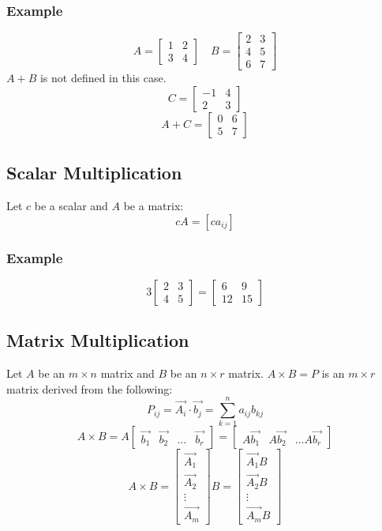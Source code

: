 \documentclass[letterpaper, 12pt]{math}
\begin{document}
\subsubsection*{Example}
\[ A = \begin{bmatrix}1 & 2 \\ 3 & 4\end{bmatrix} \quad
  B = \begin{bmatrix}2 & 3 \\ 4 & 5 \\ 6 & 7\end{bmatrix} \]
\( A+B \) is not defined in this case.
\[ C = \begin{bmatrix}-1 & 4 \\ 2 & 3\end{bmatrix} \]
\[ A+C = \begin{bmatrix}0 & 6 \\ 5 & 7\end{bmatrix} \]

\subsection*{Scalar Multiplication}
Let \( c \) be a scalar and \( A \) be a matrix:
\[ cA = [ca_{ij}] \]

\subsubsection*{Example}
\[ 3\begin{bmatrix}2 & 3 \\ 4 & 5\end{bmatrix} =
  \begin{bmatrix}6 & 9 \\ 12 & 15\end{bmatrix} \]

\subsection*{Matrix Multiplication}
Let \( A \) be an \( m\times n \) matrix and \( B \) be an \( n\times r \)
matrix. \( A\times B = P \) is an \( m\times r \) matrix derived from
the following:
\[ P_{ij} = \vec{A_i}\cdot\vec{b_{j}} = \sum_{k=1}^{n}a_{ij}b_{kj} \]
\[ A\times B = A\begin{bmatrix}\vec{b_1} & \vec{b_2} & \dots &
  \vec{b_r}\end{bmatrix} = \begin{bmatrix}A\vec{b_1} & A\vec{b_2} & \dots
  A\vec{b_r}\end{bmatrix} \]
\[ A\times B = \begin{bmatrix}\vec{A_1} \\ \vec{A_2} \\ \vdots \\ \vec{A_m}
  \end{bmatrix}B = \begin{bmatrix}\vec{A_1}B \\ \vec{A_2}B \\ \vdots \\
  \vec{A_m}B\end{bmatrix} \]
\end{document}
